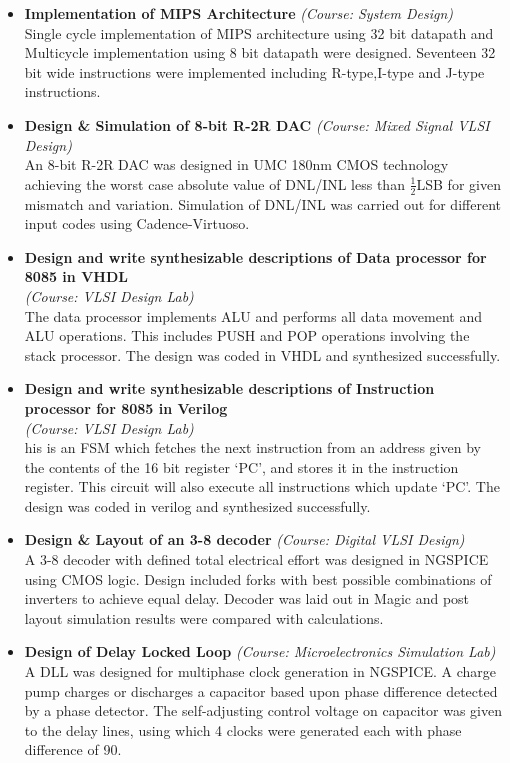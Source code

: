 \documentclass[a4paper,10pt]{article}
\begin{document}
 \begin{itemize}
  \setlength{\itemsep}{1pt}

  \item \textbf{{Implementation of MIPS Architecture}} \textit{(Course: System Design)}\\
	Single cycle implementation of MIPS architecture using 32 bit datapath and Multicycle implementation using 8 bit datapath were designed.
	Seventeen 32 bit wide instructions were implemented including R-type,I-type and J-type instructions.

  \item \textbf{{Design \& Simulation of 8-bit R-2R DAC}}   \textit{(Course: Mixed Signal VLSI Design)}\\
	An 8-bit R-2R DAC was designed in UMC 180nm CMOS technology achieving the worst case absolute value of DNL/INL less than
	$\frac{1}{2}$LSB for given mismatch and variation. Simulation of DNL/INL was carried out for different input codes using Cadence-Virtuoso.

  \item \textbf{{Design and write synthesizable descriptions of Data processor for 8085 in VHDL}}\\ \textit{(Course: VLSI Design Lab)}\\
	The data processor  implements ALU and performs  all data movement and ALU operations.
	This includes PUSH and POP operations involving the stack processor. The design was coded in
	VHDL and synthesized successfully.
  \item \textbf{{Design and write synthesizable descriptions of Instruction processor for 8085 in Verilog}}\\ \textit{(Course: VLSI Design Lab)}\\
	his is an FSM which fetches the next instruction from an address given by the contents of the 16 bit register ‘PC’, 
	and stores it in the instruction register. This circuit will also execute all instructions which update ‘PC’.
	The design was coded in verilog and synthesized successfully.


  \item \textbf{{Design \& Layout of an 3-8 decoder}}   \textit{(Course: Digital VLSI Design)}\\
	A 3-8 decoder with defined total electrical effort was designed in NGSPICE using CMOS logic. Design included forks with
	best possible combinations of inverters to achieve equal delay. Decoder was laid out in Magic and post layout
	simulation results were compared with calculations.

  \item \textbf{{Design of Delay Locked Loop}} \textit{(Course: Microelectronics Simulation Lab)}\\
	A DLL was designed for multiphase clock generation in NGSPICE. A charge pump charges or discharges a capacitor based
	upon phase difference detected by a phase detector. The self-adjusting control voltage on capacitor was given to the delay lines,
	using which 4 clocks were generated each with phase difference of 90\textdegree.

  
 \end{itemize}
\end{document}
